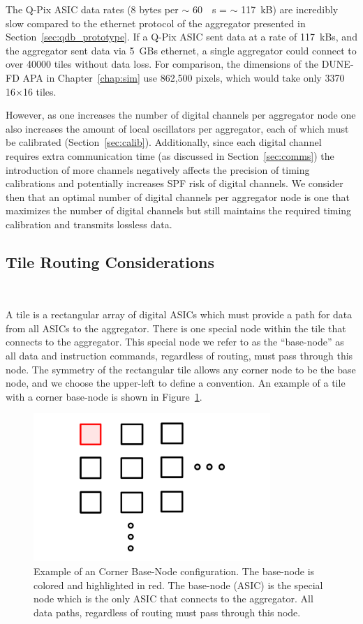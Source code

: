 The Q-Pix ASIC data rates (8 bytes per $\sim$ 60~\unit{\mu s} = $\sim$ 117~\unit{kB}) are incredibly slow compared to the ethernet protocol of the aggregator presented in Section~\ref{sec:qdb_prototype}.
If a Q-Pix ASIC sent data at a rate of 117~\unit{kBs}, and the aggregator sent data via 5~\unit{GBs} ethernet, a single aggregator could connect to over 40000 tiles without data loss.
For comparison, the dimensions of the DUNE-FD APA in Chapter~\ref{chap:sim} use 862,500 pixels, which would take only 3370 16$\times$16 tiles.

However, as one increases the number of digital channels per aggregator node one also increases the amount of local oscillators per aggregator, each of which must be calibrated (Section~\ref{sec:calib}).
Additionally, since each digital channel requires extra communication time (as discussed in Section~\ref{sec:comms}) the introduction of more channels negatively affects the precision of timing calibrations and potentially increases SPF risk of digital channels.
We consider then that an optimal number of digital channels per aggregator node is one that maximizes the number of digital channels but still maintains the required timing calibration and transmits lossless data.

\subsection{Tile Routing Considerations}~\label{sec:tile_sim}

A tile is a rectangular array of digital ASICs which must provide a path for data from all ASICs to the aggregator.
There is one special node within the tile that connects to the aggregator.
This special node we refer to as the ``base-node'' as all data and instruction commands, regardless of routing, must pass through this node.
The symmetry of the rectangular tile allows any corner node to be the base node, and we choose the upper-left to define a convention.
An example of a tile with a corner base-node is shown in Figure~\ref{fig:cbn}.

\begin{figure}[]
\centering
\includegraphics[width=0.8\textwidth]{images/CBN.pdf}
\caption{Example of an Corner Base-Node configuration.
The base-node is colored and highlighted in red.
The base-node (ASIC) is the special node which is the only ASIC that connects to the aggregator. 
All data paths, regardless of routing must pass through this node.
}
\label{fig:cbn}
\end{figure}

